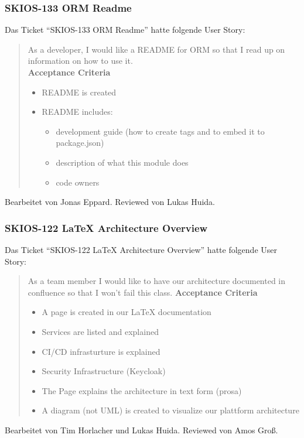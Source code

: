 \subsubsection{SKIOS-133 ORM Readme}
Das Ticket \enquote{SKIOS-133 ORM Readme} hatte folgende User Story:
\begin{quotation}
    As a developer, I would like a README for ORM so that I read up on information on how to use it. \\
\textbf{Acceptance Criteria}
\begin{itemize}
    \item README is created
    \item README includes:
    \begin{itemize}
        \item development guide (how to create tags and to embed it to package.json)
        \item description of what this module does
        \item code owners 
    \end{itemize}
\end{itemize}
\end{quotation}
Bearbeitet von Jonas Eppard.
Reviewed von Lukas Huida.

\subsubsection{SKIOS-122 LaTeX Architecture Overview}
Das Ticket \enquote{SKIOS-122 LaTeX Architecture Overview} hatte folgende User Story:
\begin{quotation}
    As a team member I would like to have our architecture documented in confluence so that I won’t fail this class.
\textbf{Acceptance Criteria}
\begin{itemize}
    \item A page is created in our LaTeX documentation
    \item Services are listed and explained
    \item CI/CD infrasturture is explained
    \item Security Infrastructure (Keycloak)
    \item The Page explains the architecture in text form (prosa) 
    \item A diagram (not UML) is created to visualize our plattform architecture
\end{itemize}
\end{quotation}
Bearbeitet von Tim Horlacher und Lukas Huida.
Reviewed von Amos Groß.

